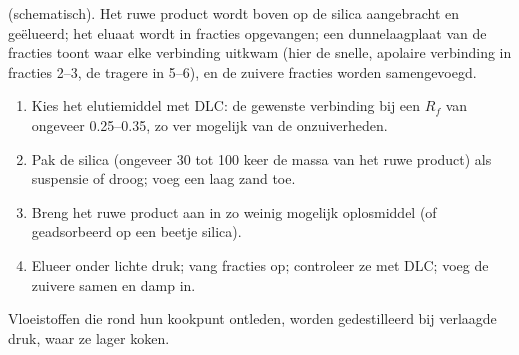 \begin{omfigure}
\par\vspace{4pt}

{\small {} (schematisch). Het ruwe product wordt boven op de silica aangebracht en geëlueerd;
het eluaat wordt in fracties opgevangen; een dunnelaagplaat van de fracties toont waar elke verbinding uitkwam
(hier de snelle, apolaire verbinding in fracties 2--3, de tragere in 5--6), en de zuivere fracties worden
samengevoegd.}
\end{omfigure}

\begin{method}\label{met:b2:lab-techniques-2:flash}
\begin{enumerate}
  \item Kies het elutiemiddel met DLC: de gewenste verbinding bij een $R_f$ van ongeveer 0.25--0.35, zo ver mogelijk van
        de onzuiverheden.
  \item Pak de silica (ongeveer 30 tot 100 keer de massa van het ruwe product) als suspensie of droog; voeg een laag
        zand toe.
  \item Breng het ruwe product aan in zo weinig mogelijk oplosmiddel (of geadsorbeerd op een beetje silica).
  \item Elueer onder lichte druk; vang fracties op; controleer ze met DLC; voeg de zuivere samen en
        damp in.
\end{enumerate}
\end{method}

Vloeistoffen die rond hun kookpunt ontleden, worden gedestilleerd bij verlaagde druk, waar ze
lager koken.

